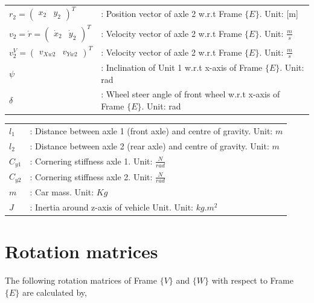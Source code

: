 \documentclass[12pt]{article}
\begin{document}
\begin{table}[H]
\begin{tabular}{p{4cm} p{10cm}}
$r_2 = \begin{pmatrix} x_2 & y_2 \end{pmatrix}^T$ & : Position vector of axle 2 w.r.t Frame $ \{ E \}$. Unit: [m]\\
$v_2 = \dot{r} = \begin{pmatrix} \dot{x}_2 & \dot{y}_2 \end{pmatrix}^T$ & : Velocity vector of axle 2 w.r.t Frame $ \{ E \}$. Unit: $ \displaystyle \frac{m}{s}$\\
$v^V_2 = \begin{pmatrix} v_{Xw2} & v_{Yw2} \end{pmatrix}^T$ & : Velocity vector of axle 2 w.r.t Frame $ \{ E \}$. Unit: $ \displaystyle \frac{m}{s}$\\
$\psi$  & : Inclination of Unit 1 w.r.t x-axis of Frame $ \{ E \}$. Unit: rad\\
$\delta$  & : Wheel steer angle of front wheel w.r.t x-axis of Frame $ \{ E \}$. Unit: rad\\
\end{tabular}
\end{table}

\begin{table}[H]
\begin{tabular}{p{4cm} p{10cm}}
$l_1$ & : Distance between axle 1 (front axle) and centre of gravity. Unit: $m$\\
$l_2$ & : Distance between axle 2 (rear axle) and centre of gravity. Unit: $m$\\
$C_{y1}$ & : Cornering stiffness axle 1. Unit: $\frac{N}{rad}$\\
$C_{y2}$ & : Cornering stiffness axle 2. Unit: $\frac{N}{rad}$\\
$m$ & : Car mass. Unit: $Kg$\\
$J$ & : Inertia around z-axis of vehicle Unit. Unit: $kg.m^2$\\
\end{tabular}
\end{table}

\section{Rotation matrices}
The following rotation matrices of Frame $\{ V \}$ and $\{ W \}$ with respect to Frame $\{ E \}$ are calculated by,
\end{document}
